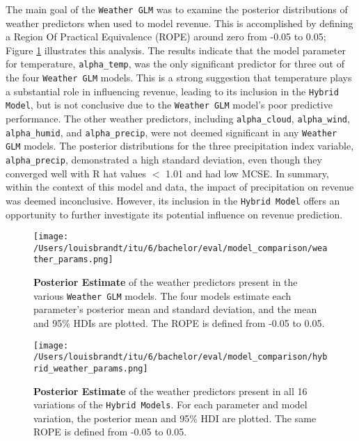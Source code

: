 The main goal of the \texttt{Weather GLM} was to examine the posterior
distributions of weather predictors when used to model revenue. This is
accomplished by defining a Region Of Practical Equivalence (ROPE) around zero
from -0.05 to 0.05; Figure \ref{fig:glm-rope} illustrates this analysis. The
results indicate that the model parameter for temperature, \texttt{alpha\_temp}, 
was the only significant predictor for three out of the four \texttt{Weather
GLM} models. This is a strong suggestion that temperature plays a substantial
role in influencing revenue, leading to its inclusion in the \texttt{Hybrid
Model}, but is not conclusive due to the \texttt{Weather GLM} model's poor
predictive performance. The other weather predictors, including
\texttt{alpha\_cloud}, \texttt{alpha\_wind}, \texttt{alpha\_humid}, and
\texttt{alpha\_precip}, were not deemed significant in any
\texttt{Weather GLM} models. The posterior distributions for the three
precipitation index variable, \texttt{alpha\_precip}, demonstrated a high
standard deviation, even though they converged well with R hat values $<$ 1.01
and had low MCSE. In summary, within the context of this model and data, the
impact of precipitation on revenue was deemed inconclusive. However, its
inclusion in the \texttt{Hybrid Model} offers an opportunity to further
investigate its potential influence on revenue prediction.
\begin{figure}[ht]
  \centering
  \texttt{[image: /Users/louisbrandt/itu/6/bachelor/eval/model\_comparison/weather\_params.png]}
  \caption{\textbf{Posterior Estimate} of the weather predictors present in the various \texttt{Weather GLM} models. The four models estimate each parameter's posterior mean and standard deviation, and the mean and 95\% HDIs are plotted. The ROPE is defined from -0.05 to 0.05.}
  \label{fig:glm-rope}
\end{figure}
\begin{figure}[ht]
  \centering
  \texttt{[image: /Users/louisbrandt/itu/6/bachelor/eval/model\_comparison/hybrid\_weather\_params.png]}
  \caption{\textbf{Posterior Estimate} of the weather predictors present in all 16 variations of the \texttt{Hybrid Models}. For each parameter and model variation, the posterior mean and 95\% HDI are plotted. The same ROPE is defined from -0.05 to 0.05.}
  \label{fig:hybrid-rope}
\end{figure}

